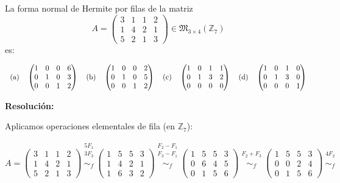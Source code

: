 \documentclass[a4paper,12pt]{article}
\begin{document}
\begin{ejercicio}[title=Ejercicio 10]
La forma normal de Hermite por filas de la matriz 
\[
A =
\begin{pmatrix}
3 & 1 & 1 & 2\\
1 & 4 & 2 & 1\\
5 & 2 & 1 & 3
\end{pmatrix}
\in \mathfrak{M}_{3\times 4}(\mathbb{Z}_7)
\]
es:

\[
\begin{tabular}{clclclcl}
(a) &
$\begin{pmatrix}
1 & 0 & 0 & 6\\
0 & 1 & 0 & 3\\
0 & 0 & 1 & 2
\end{pmatrix}$ &
(b) &
$\begin{pmatrix}
1 & 0 & 0 & 2\\
0 & 1 & 0 & 5\\
0 & 0 & 1 & 2
\end{pmatrix}$ &
(c) &
$\begin{pmatrix}
1 & 0 & 1 & 1\\
0 & 1 & 3 & 2\\
0 & 0 & 0 & 0
\end{pmatrix}$ &
(d) &
$\begin{pmatrix}
1 & 0 & 1 & 0\\
0 & 1 & 3 & 0\\
0 & 0 & 0 & 1
\end{pmatrix}$
\end{tabular}
\]

\tcblower
\textbf{Resolución:}

Aplicamos operaciones elementales de fila (en $\mathbb{Z}_7$):

\[
A =
\begin{pmatrix}
3 & 1 & 1 & 2\\
1 & 4 & 2 & 1\\
5 & 2 & 1 & 3
\end{pmatrix}
\overset{\substack{5F_1 \\ 3F_3 \\{}}}{\sim_f}
\begin{pmatrix}
1 & 5 & 5 & 3\\
1 & 4 & 2 & 1\\
1 & 6 & 3 & 2
\end{pmatrix}
\overset{\substack{F_2 - F_1 \\ F_3 - F_1 \\{}}}{\sim_f}
\begin{pmatrix}
1 & 5 & 5 & 3\\
0 & 6 & 4 & 5\\
0 & 1 & 5 & 6
\end{pmatrix}
\overset{\substack{F_2 + F_3 \\{}}}{\sim_f}
\begin{pmatrix}
1 & 5 & 5 & 3\\
0 & 0 & 2 & 4\\
0 & 1 & 5 & 6
\end{pmatrix}
\overset{\substack{4F_2 \\{}}}{\sim_f}
\]


\end{ejercicio}
\end{document}
